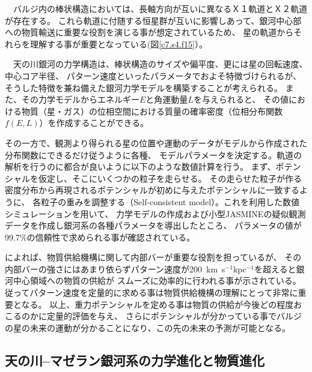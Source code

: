 　バルジ内の棒状構造においては、長軸方向が互いに異なるＸ１軌道とＸ２軌道が存在する。
これら軌道に付随する恒星群が互いに影響しあって、銀河中心部への物質輸送に重要な役割を演じる事が想定されているため、
星の軌道からそれらを理解する事が重要となっている(図\ref{c7.s4.f15}）。

　天の川銀河の力学構造は、棒状構造のサイズや偏平度、更には星の回転速度、中心コア半径、
パターン速度といったパラメータでおよそ特徴づけられるが、
そうした特徴を兼ね備えた銀河力学モデルを構築することが考えられる。
また、その力学モデルからエネルギー$E$と角運動量$L$を与えられると、
その値における物質（星・ガス）の位相空間における質量の確率密度（位相分布関数$f(E,L)$）を作成することができる。

その一方で、観測より得られる星の位置や運動のデータがモデルから作成された分布関数にできるだけ従うように各種、
モデルパラメータを決定する。軌道の解析を行うのに都合が良いように以下のような数値計算を行う。
まず、ポテンシャルを仮定し、そこにいくつかの粒子を走らせる。
その走らせた粒子が作る密度分布から再現されるポテンシャルが初めに与えたポテンシャルに一致するように、
各粒子の重みを調整する（Self-consistent model）。これを利用した数値シミュレーションを用いて、
力学モデルの作成および小型JASMINEの疑似観測データを作成し銀河系の各種パラメータを導出したところ、
パラメータの値が99.7\%の信頼性で求められる事が確認されている。

\citet{2009ApJ...691.1525N}によれば、物質供給機構に関して内部バーが重要な役割を担っているが、
その内部バーの強さにはあまり依らずパターン速度が200~km~s$^{-1}$kpc$^{-1}$を超えると銀河中心領域への物質の供給が
スムーズに効率的に行われる事が示されている。
従ってパターン速度を定量的に求める事は物質供給機構の理解にとって非常に重要となる。
以上、重力ポテンシャルを定める事は物質の供給が今後どの程度おこるのかに定量的評価を与え、
さらにポテンシャルが分かっている事でバルジの星の未来の運動が分かることになり、この先の未来の予測が可能となる。

\setcounter{subsection}{3}\subsection{天の川--マゼラン銀河系の力学進化と物質進化}\label{c7.s4.ss4}

